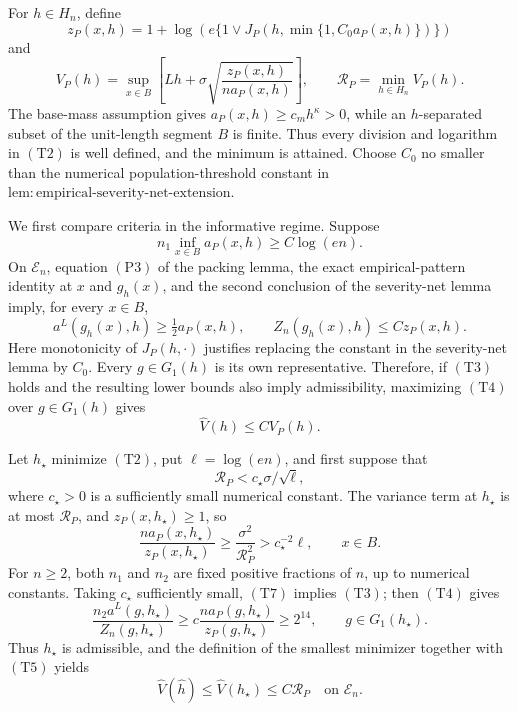 For \(h\in H_n\), define
\[
 z_P(x,h)=1+\log\!\left(
 e\{1\vee J_P(h,\min\{1,C_0a_P(x,h)\})\}\right)
\]
and
\[
 V_P(h)=\sup_{x\in B}\left[
 Lh+\sigma\sqrt{\frac{z_P(x,h)}{na_P(x,h)}}\right],
 \qquad
 \mathcal R_P=\min_{h\in H_n}V_P(h).
 \tag{T2}
\]
The base-mass assumption gives
\(a_P(x,h)\geq c_mh^\kappa>0\), while an \(h\)-separated subset of the
unit-length segment \(B\) is finite.  Thus every division and logarithm in
\((\mathrm{T2})\) is well defined, and the minimum is attained.  Choose
\(C_0\) no smaller than the numerical population-threshold constant in
\(\mathrm{lem{:}empirical\text{-}severity\text{-}net\text{-}extension}\).

We first compare criteria in the informative regime.  Suppose
\[
 n_1\inf_{x\in B}a_P(x,h)\geq C\log(en).
 \tag{T3}
\]
On \(\mathcal E_n\), equation \((\mathrm{P3})\) of the packing lemma, the
exact empirical-pattern identity at \(x\) and \(g_h(x)\), and the second
conclusion of the severity-net lemma imply, for every \(x\in B\),
\[
 a^L(g_h(x),h)\geq\tfrac12a_P(x,h),
 \qquad
 Z_n(g_h(x),h)\leq C z_P(x,h).
 \tag{T4}
\]
Here monotonicity of \(J_P(h,\cdot)\) justifies replacing the constant in
the severity-net lemma by \(C_0\).  Every \(g\in G_1(h)\) is its own
representative.  Therefore, if \((\mathrm{T3})\) holds and the resulting
lower bounds also imply admissibility, maximizing \((\mathrm{T4})\) over
\(g\in G_1(h)\) gives
\[
 \widehat V(h)\leq C V_P(h).
 \tag{T5}
\]

Let \(h_\star\) minimize \((\mathrm{T2})\), put
\(\ell=\log(en)\), and first suppose that
\[
 \mathcal R_P<c_\star\sigma/\sqrt\ell,
 \tag{T6}
\]
where \(c_\star>0\) is a sufficiently small numerical constant.  The
variance term at \(h_\star\) is at most \(\mathcal R_P\), and
\(z_P(x,h_\star)\geq1\), so
\[
 \frac{na_P(x,h_\star)}{z_P(x,h_\star)}
 \geq\frac{\sigma^2}{\mathcal R_P^2}
 >c_\star^{-2}\ell,
 \qquad x\in B.
 \tag{T7}
\]
For \(n\geq2\), both \(n_1\) and \(n_2\) are fixed positive fractions of
\(n\), up to numerical constants.  Taking \(c_\star\) sufficiently small,
\((\mathrm{T7})\) implies \((\mathrm{T3})\); then \((\mathrm{T4})\) gives
\[
 \frac{n_2a^L(g,h_\star)}{Z_n(g,h_\star)}
 \geq c\frac{na_P(g,h_\star)}{z_P(g,h_\star)}
 \geq2^{14},\qquad g\in G_1(h_\star).
\]
Thus \(h_\star\) is admissible, and the definition of the smallest
minimizer together with \((\mathrm{T5})\) yields
\[
 \widehat V(\widehat h)\leq\widehat V(h_\star)
 \leq C\mathcal R_P
 \quad\text{on }\mathcal E_n.
 \tag{T8}
\]

